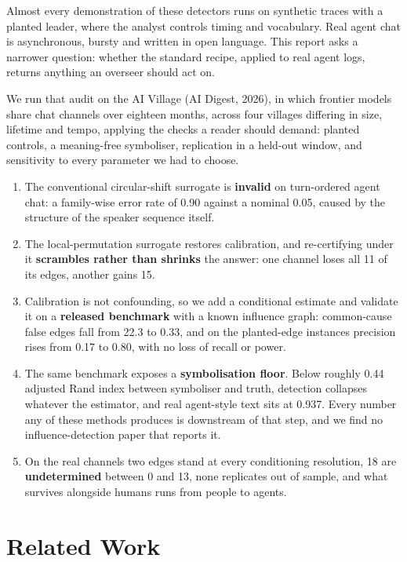 \documentclass[11pt]{article}
\begin{document}
Almost every demonstration of these detectors runs on synthetic traces with a planted leader, where the analyst controls timing and vocabulary. Real agent chat is asynchronous, bursty and written in open language. This report asks a narrower question: whether the standard recipe, applied to real agent logs, returns anything an overseer should act on.

We run that audit on the AI Village (AI Digest, 2026), in which frontier models share chat channels over eighteen months, across four villages differing in size, lifetime and tempo, applying the checks a reader should demand: planted controls, a meaning-free symboliser, replication in a held-out window, and sensitivity to every parameter we had to choose.

\begin{enumerate}
\item The conventional circular-shift surrogate is \textbf{invalid} on turn-ordered agent chat: a family-wise error rate of 0.90 against a nominal 0.05, caused by the structure of the speaker sequence itself.
\item The local-permutation surrogate restores calibration, and re-certifying under it \textbf{scrambles rather than shrinks} the answer: one channel loses all 11 of its edges, another gains 15.
\item Calibration is not confounding, so we add a conditional estimate and validate it on a \textbf{released benchmark} with a known influence graph: common-cause false edges fall from 22.3 to 0.33, and on the planted-edge instances precision rises from 0.17 to 0.80, with no loss of recall or power.
\item The same benchmark exposes a \textbf{symbolisation floor}. Below roughly 0.44 adjusted Rand index between symboliser and truth, detection collapses whatever the estimator, and real agent-style text sits at 0.937. Every number any of these methods produces is downstream of that step, and we find no influence-detection paper that reports it.
\item On the real channels two edges stand at every conditioning resolution, 18 are \textbf{undetermined} between 0 and 13, none replicates out of sample, and what survives alongside humans runs from people to agents.
\end{enumerate}

\section{Related Work}
\end{document}
